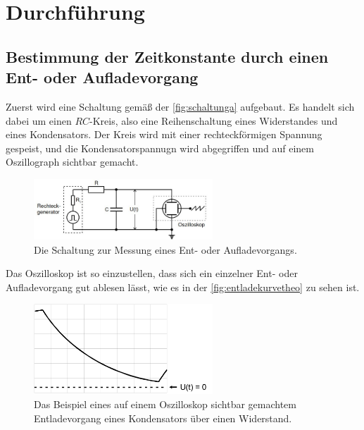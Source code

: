 \section{Durchführung}
\label{sec:Durchführung}

\subsection{Bestimmung der Zeitkonstante durch einen Ent- oder Aufladevorgang}

    Zuerst wird eine Schaltung gemäß der \autoref{fig:schaltunga} aufgebaut. Es handelt sich dabei um einen $RC$-Kreis, also eine Reihenschaltung eines Widerstandes
    und eines Kondensators. Der Kreis wird mit einer rechteckförmigen Spannung gespeist, und die Kondensatorspannugn wird abgegriffen und auf einem Oszillograph
    sichtbar gemacht. 

    \begin{figure}[H]
        \centering
        \includegraphics[width=0.6\textwidth]{bilder/aufbau_schaltunga.jpg}
        \caption{Die Schaltung zur Messung eines Ent- oder Aufladevorgangs. \cite{anleitung}}
        \label{fig:schaltunga}
    \end{figure}

    \noindent Das Oszilloskop ist so einzustellen, dass sich ein einzelner Ent- oder Aufladevorgang gut ablesen lässt, wie es in der \autoref{fig:entladekurvetheo}
    zu sehen ist.

    \begin{figure}
        \centering
        \includegraphics[width=0.6\textwidth]{bilder/Entladekurve.PNG}
        \caption{Das Beispiel eines auf einem Oszilloskop sichtbar gemachtem Entladevorgang eines Kondensators über einen Widerstand. \cite{anleitung}}
        \label{fig:entladekurvetheo}
    \end{figure}


